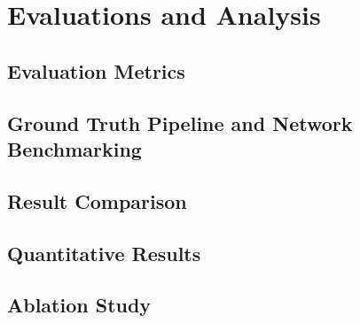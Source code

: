 %
%
% 
% 
% 



\chapter{Evaluations and Analysis}
\label{chap:Style}
\section{Evaluation Metrics}
\section{Ground Truth Pipeline and Network Benchmarking}
\section{Result Comparison}
\section{Quantitative Results}
\section{Ablation Study}

